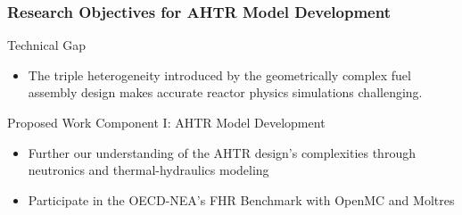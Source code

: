\begin{frame}
  \frametitle{Research Objectives for AHTR Model Development}
  \begin{block}{Technical Gap}
    \begin{itemize}
      \item The triple heterogeneity introduced by the geometrically complex 
      fuel assembly design makes accurate reactor physics simulations challenging. 
    \end{itemize}
  \end{block}
  \begin{block}{Proposed Work Component I: AHTR Model Development}
    \begin{itemize}
      \item Further our understanding of the AHTR design's complexities 
      through neutronics and thermal-hydraulics modeling
      \item Participate in the OECD-NEA's FHR Benchmark with 
      OpenMC and Moltres
    \end{itemize}
  \end{block}
\end{frame}
